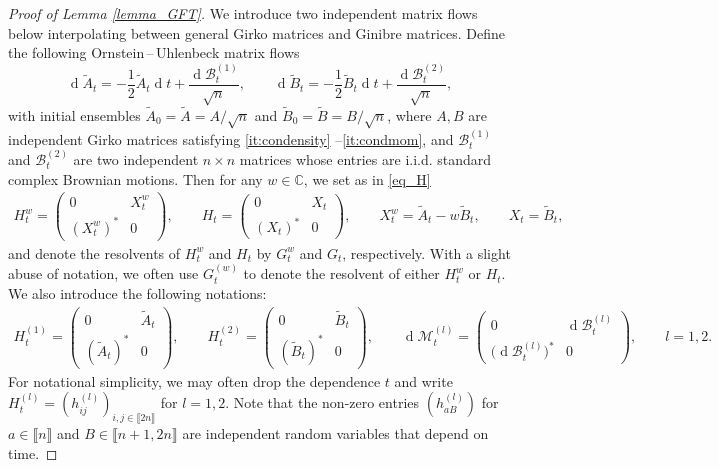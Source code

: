 \documentclass[10pt,reqno]{amsart}
\numberwithin{equation}{section}
\numberwithin{figure}{section}
\theoremstyle{plain}
\newcommand{\C}{{\mathbb{C}}}
\newcommand{\A}{{\tilde{A}}}
\newcommand{\B}{{\tilde{B}}}
\newcommand{\<}{\langle}
\renewcommand{\>}{\rangle}
\newcommand{\dd}{\operatorname{d}\!{}}
\begin{document}
\begin{proof}[Proof of Lemma \ref{lemma_GFT}]
We introduce two independent matrix flows below interpolating between general Girko matrices and Ginibre matrices. Define the following Ornstein\,--\,Uhlenbeck matrix flows
	\begin{equation}\label{OU}
		\dd  \A_t=-\frac{1}{2} \A_t \dd t+\frac{\dd  \mathcal{B}^{(1)}_t}{\sqrt{n}}, \qquad \dd  \B_t=-\frac{1}{2} \B_t \dd  t+\frac{\dd  \mathcal{B}^{(2)}_t}{\sqrt{n}}, 
	\end{equation}
	with initial ensembles $\A_0=\A=A/\sqrt{n}$ and $\B_0=\B=B/\sqrt{n}$, where $A,B$ are independent Girko matrices satisfying \ref{it:condensity} --\ref{it:condmom}, and $\mathcal{B}^{(1)}_t$ and $\mathcal{B}^{(2)}_t$ are two independent $n\times n$ matrices whose entries are i.i.d. standard complex Brownian motions. 	Then for any $w \in \C$, we set as in \eqref{eq_H}
	\begin{align}\label{xh}
		H^w_{t}=\begin{pmatrix}
			0  &   X^w_{t} \\
			(X^w_{t})^*    & 0
		\end{pmatrix}, \qquad 
		H_{t}=\begin{pmatrix}
			0  &   X_{t} \\
			(X_{t})^*    & 0
		\end{pmatrix},\qquad  X^{w}_{t}=\A_t-w \B_t, \qquad X_{t}=\B_t,
	\end{align}
	and denote the resolvents of $H^{w}_{t}$ and $H_{t}$ by $G^{w}_{t}$ and $G_{t}$, respectively. 
	With a slight abuse of notation, we often use $G_t^{(w)}$ to denote the resolvent of either $H_t^{w}$ or $H_t$.
	We also introduce the following notations:
	\begin{align}\label{def_HAB}
		H_t^{(1)}=\begin{pmatrix}
			0  &   \A_t \\
			(\A_t)^*    & 0
		\end{pmatrix}, \qquad H_t^{(2)}=\begin{pmatrix}
			0  &   \B_t \\
			(\B_t)^*    & 0
		\end{pmatrix}, \qquad \dd\mathcal{M}^{(l)}_t=\begin{pmatrix}
			0  &   \dd\mathcal{B}^{(l)}_t \\
			\big(\dd\mathcal{B}^{(l)}_t\big)^*    & 0
		\end{pmatrix}, \qquad l=1,2.
	\end{align}
	For notational simplicity, we may often drop the dependence $t$ and write $H^{(l)}_t=(h^{(l)}_{ij})_{i,j\in 
		\llbracket 2n \rrbracket}$ for $l=1,2$.
	Note that the non-zero entries $(h^{(l)}_{aB})$ for $a\in \llbracket n \rrbracket$ and 
	$B\in \llbracket n+1,2n \rrbracket$ are independent random variables that depend on time. 
	

\end{proof}
\end{document}
